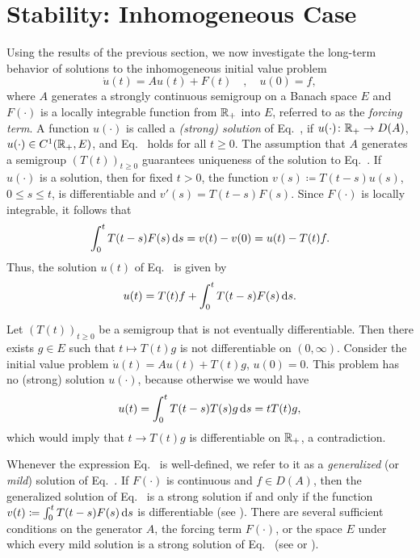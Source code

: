 \section{Stability: Inhomogeneous Case}\label{sec:a4-2}
Using the results of the previous section, we now investigate the long-term behavior of solutions to the inhomogeneous initial value
problem
\begin{equation}\label{eq:a4-2.1}
\dot{u}(t) = Au(t) + F(t) \quad , \quad u(0) = f,
\end{equation}
where $A$ generates a strongly continuous semigroup on a
Banach space $ E $ and $F(\cdot)$ is a locally integrable function from $\mathbb{R}_{+}$
into $ E $, referred to as the \emph{forcing term}. 
A function $u(\cdot)$ is called a \emph{(strong) solution} of Eq.~, if\/ $u(\cdot) \colon \mathbb{R}_{+} \to D(A)$, 
$u(\cdot) \in C^{1}(\mathbb{R}_{+},E)$, and Eq.~ holds for all $t \geq 0$.
The assumption that $A$ generates a semigroup $(T(t))_{t \geq 0}$
guarantees uniqueness of the solution to Eq.~. 
If\/ $u(\cdot)$ is a solution, then for fixed $t>0$, the function $v(s) \coloneq  T(t-s)u(s)$, $0 \leq s \leq t$, is
differentiable and $v'(s) = T(t-s)F(s)$. 
Since $F(\cdot)$ is locally integrable, it follows that 
\[
\int_{0}^{t} T(t-s)F(s)  \mathop{}\!\mathrm{d}{s} = v(t) - v(0) = u(t) - T(t)f.
\]
Thus, the solution $u(t)$ of Eq.~ is given by
\begin{equation}\label{eq:a4-2.2}
u(t) = T(t)f + \int_{0}^{t} T(t-s)F(s)  \mathop{}\!\mathrm{d}{s} .
\end{equation}

\begin{example*} \label{ex:a4-2.1}
Let $(T(t))_{t \geq 0}$ be a semigroup that is not eventually differentiable. 
Then there
exists $g \in E$ such that $t \mapsto T(t)g$ is not differentiable on $(0,\infty)$.
Consider the initial value problem $\dot{u}(t) = Au(t) + T(t)g$, $u(0) = 0$. This problem has no
(strong) solution $u(\cdot)$, because otherwise we would have 
\begin{align*}
u(t) = \int_{0}^{t} T(t-s)T(s)g  \mathop{}\!\mathrm{d}{s} = tT(t)g,
\end{align*}
which would imply that $t\to T(t)g$ is 
differentiable on $\mathbb{R}_{+}$, a contradiction. 
\end{example*}


Whenever the expression Eq.~ is well-defined, we refer to it as a  \emph{generalized} (or
\emph{mild}) solution of Eq.~. 
If\/ $F(\cdot)$ is continuous and $f \in D(A)$, then
the generalized solution of Eq.~ is a strong solution if and only if the function 
$v(t) \coloneq  \int_{0}^{t} T(t-s)F(s)  \mathop{}\!\mathrm{d}{s}$ is differentiable (see \textcite[Chapter~4,2.4]{pazy:1983}). 
There are several sufficient conditions on the generator $A$,
the forcing term $F(\cdot)$, or the space $E$ under which every mild solution
is a strong solution of Eq.~ (see \textcite{travis:1981}
or  \textcite[Section~4.2]{pazy:1983}).


